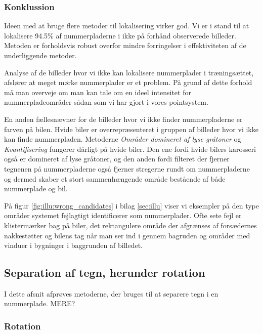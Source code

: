 \subsubsection{Konklussion}
Ideen med at bruge flere metoder til lokalisering virker god. Vi er i stand til at lokalisere 94.5\% af nummerpladerne i ikke på forhånd observerede billeder. Metoden er forholdsvis robust overfor mindre forringelser i effektiviteten af de underliggende metoder.

Analyse af de billeder hvor vi ikke kan lokalisere nummerplader i træningsættet, afslører at meget mørke nummerplader er et problem. På grund af dette forhold må man overveje om man kan tale om en ideel intensitet for nummerpladeområder sådan som vi har gjort i vores pointsystem.

En anden fællesnævner for de billeder hvor vi ikke finder nummerpladerne er farven på bilen. Hvide biler er overrepræsenteret i gruppen af billeder hvor vi ikke kan finde nummerpladen. Metoderne \textit{Områder domineret af lyse gråtoner} og \textit{Kvantifisering} fungerer dårligt på hvide biler. Den ene fordi hvide bilers karosseri også er domineret af lyse gråtoner, og den anden fordi filteret der fjerner tegnenen på nummerpladerne også fjerner stregerne rundt om nummerpladerne og dermed skaber et stort sammenhængende område bestående af både nummerplade og bil. 

På figur \vref{fig:illu:wrong_candidates} i bilag \ref{sec:illu} viser vi eksempler på den type områder systemet fejlagtigt identificerer som nummerplader. Ofte sete fejl er klistermærker bag på biler, det rektangulere område der afgrænses af forsædernes nakkestøtter og bilens tag når man ser ind i gennem bagruden og områder med vinduer i bygninger i baggrunden af billedet.  



\subsection{Separation af tegn, herunder rotation}


I dette afsnit afprøves metoderne, der bruges til at separere tegn i en nummerplade. MERE?

\subsubsection*{Rotation}


